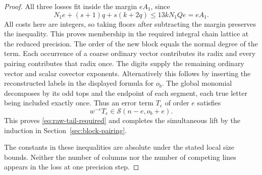 \begin{proof}
All three losses fit inside the
margin \(eA_1\), since
\[
    N_1e+(s+1)q+s(k+2q)\le13kN_1Qe=eA_1 .
\]
All costs here are integers, so taking floors after subtracting
the margin preserves the inequality. This proves membership in
the required integral chain lattice at the reduced precision.
The order of the new block equals the normal degree of the
term. Each occurrence of a coarse ordinary vector contributes its radix
and every pairing contributes that radix once. The digits supply
the remaining ordinary vector and scalar covector exponents.
Alternatively this follows by inserting the reconstructed labels
in the displayed formula for \(o_b\). The global monomial
decomposes by its odd tops and the endpoint of each segment,
each true letter being included exactly once. Thus an error term \(T_e\) of order \(e\) satisfies
\[
 w^{-e}T_e\in\mathcal S(n-e,o_b+e).
\]
This proves
\eqref{eq:raw-tail-required} and completes the simultaneous lift
by the induction in Section~\ref{sec:block-pairing}.

The constants in these inequalities are absolute under the stated local size bounds.
Neither the number of columns nor the number of competing
lines appears in the loss at one precision step.
\end{proof}
